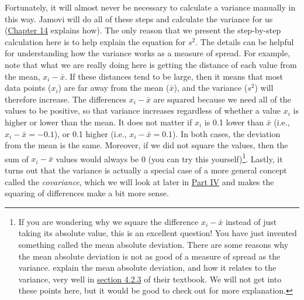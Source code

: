 \documentclass[
]{scrbook}
\begin{document}
Fortunately, it will almost never be necessary to calculate a variance manually in this way.
Jamovi will do all of these steps and calculate the variance for us (\protect\hyperlink{Chapter_14}{Chapter 14} explains how).
The only reason that we present the step-by-step calculation here is to help explain the equation for \(s^{2}\).
The details can be helpful for understanding how the variance works as a measure of spread.
For example, note that what we are really doing here is getting the distance of each value from the mean, \(x_{i} - \bar{x}\).
If these distances tend to be large, then it means that most data points (\(x_{i}\)) are far away from the mean (\(\bar{x}\)), and the variance (\(s^{2}\)) will therefore increase.
The differences \(x_{i} - \bar{x}\) are squared because we need all of the values to be positive, so that variance increases regardless of whether a value \(x_{i}\) is higher or lower than the mean.
It does not matter if \(x_{i}\) is 0.1 lower than \(\bar{x}\) (i.e., \(x_{i} - \bar{x} = -0.1\)), or 0.1 higher (i.e., \(x_{i} - \bar{x} = 0.1\)).
In both cases, the deviation from the mean is the same.
Moreover, if we did not square the values, then the sum of \(x_{i} - \bar{x}\) values would always be 0 (you can try this yourself)\footnote{If you are wondering why we square the difference \(x_{i} - \bar{x}\) instead of just taking its absolute value, this is an excellent question! You have just invented something called the mean absolute deviation. There are some reasons why the mean absolute deviation is not as good of a measure of spread as the variance. \citet{Navarro2022} explain the mean absolute deviation, and how it relates to the variance, very well in \href{https://davidfoxcroft.github.io/lsj-book/04-Descriptive-statistics.html\#mean-absolute-deviation}{section 4.2.3} of their textbook. We will not get into these points here, but it would be good to check out \citet{Navarro2022} for more explanation.}.
Lastly, it turns out that the variance is actually a special case of a more general concept called the \emph{covariance}, which we will look at later in \protect\hyperlink{Week9}{Part IV} and makes the squaring of differences make a bit more sense.
\end{document}
